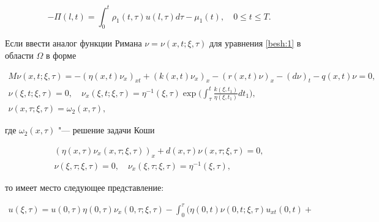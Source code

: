 $$

-\Pi(l,t)=\int^{t}_{0}\rho_{1}(t,\tau)u(l,\tau)d\tau-\mu_{1}(t),

\quad 0 \leq t\leq T.

$$



\smallskip



\begin{remark} Если ввести аналог функции Римана $\nu=\nu(x,t; \xi,\tau)$ для уравнения \eqref{besh:1} в области $\Omega$ в форме

\begin{gather*}

M\nu(x,t;\xi,\tau)=-(\eta(x,t) \nu_{x})_{xt}+(k(x,t)\nu_{x})_{x}

-(r(x,t)\nu)_{x}-(d\nu)_{t}- q(x,t)\nu=0,

\\

\nu(\xi,t;\xi,\tau)=0, \quad 

\nu_{x}(\xi,t;\xi,\tau)={\eta^{-1}(\xi,\tau)}

\exp \biggl({\int^{t}_{\tau}\frac{k(\xi,t_{1})}{\eta(\xi,t_{1})}dt_{1}}\biggr),

\\

\nu(x,\tau;\xi,\tau)=\omega_{2}(x,\tau),

\end{gather*}

где $\omega_{2}(x,\tau)$ "--- решение задачи Коши

\begin{gather*}

(\eta(x,\tau)\nu_{x}(x,\tau;\xi,\tau))_{x} +

d(x,\tau)\nu(x,\tau;\xi,\tau)=0,

\\

\nu(\xi,\tau;\xi,\tau)=0,

\quad 

\nu_{x}(\xi,\tau;\xi,\tau)={\eta^{-1}(\xi,\tau)},

\end{gather*}

то имеет место следующее представление:

\begin{multline}

u(\xi,\tau) = u(0,\tau)\eta(0,\tau)\nu_{x}(0,\tau;\xi,\tau) -

\int^{\tau}_0\Big(\eta(0,t)\nu(0,t;\xi,\tau)u_{xt}(0,t)+


\end{multline}
\end{remark}
